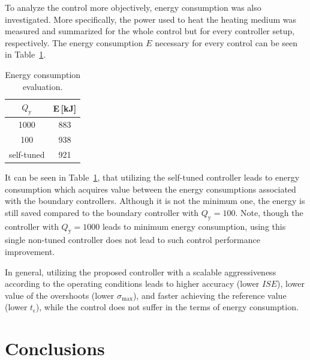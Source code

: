 \documentclass[preprint,12pt]{elsarticle}
\begin{document}
To analyze the control more objectively, energy consumption was also investigated. More specifically, the power used to heat the heating medium was measured and summarized for the whole control but for every controller setup, respectively. The energy consumption $E$ necessary for every control can be seen in Table~\ref{tab:energy}.

\begin{table}[h!]
	\begin{center}
		\caption{Energy consumption evaluation.}
		\label{tab:energy}
		\begin{tabular}{c|c} 
			$Q_\mathrm{y}$ & E\,[kJ]   \\
			\hline
			1000 &  883  \\ 
			100 & 938   \\ 
			self-tuned & 921   
		\end{tabular}
	\end{center}
\end{table}

It can be seen in Table~\ref{tab:energy}, that utilizing the self-tuned controller leads to energy consumption which acquires value between the energy consumptions associated with the boundary controllers. Although it is not the minimum one, the energy is still saved compared to the boundary controller with $Q_\mathrm{y} = 100$. Note, though the controller with $Q_\mathrm{y} = 1000$ leads to minimum energy consumption, using this single non-tuned controller does not lead to such control performance improvement.

In general, utilizing the proposed controller with a scalable aggressiveness according to the operating conditions leads to higher accuracy (lower $ISE$), lower value of the overshoots (lower $\sigma_{\mathrm{max}}$), and faster achieving the reference value (lower $t_{\epsilon}$), while the control does not suffer in the terms of energy consumption. 




\section{Conclusions}
\label{sec:conclusion}
\end{document}
